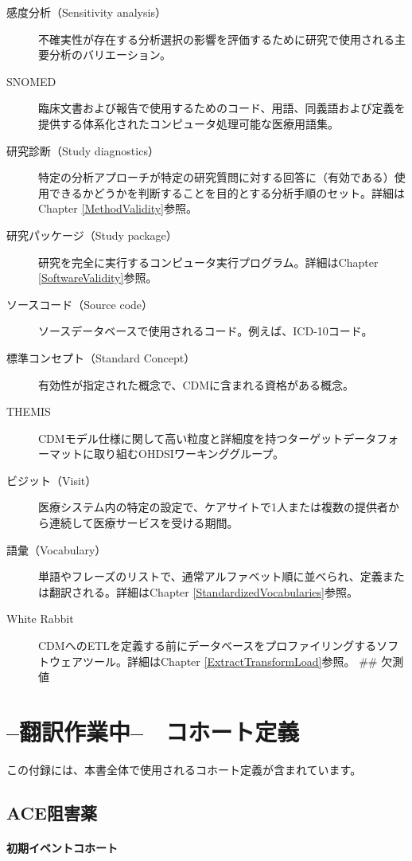 \documentclass[
  11pt]{book}
\theoremstyle{definition}
\theoremstyle{definition}
\theoremstyle{definition}
\theoremstyle{definition}
\theoremstyle{remark}
\begin{document}
\begin{description}
\item[感度分析（Sensitivity analysis）]
不確実性が存在する分析選択の影響を評価するために研究で使用される主要分析のバリエーション。
\item[SNOMED]
臨床文書および報告で使用するためのコード、用語、同義語および定義を提供する体系化されたコンピュータ処理可能な医療用語集。
\item[研究診断（Study diagnostics）]
特定の分析アプローチが特定の研究質問に対する回答に（有効である）使用できるかどうかを判断することを目的とする分析手順のセット。詳細はChapter \ref{MethodValidity}参照。
\item[研究パッケージ（Study package）]
研究を完全に実行するコンピュータ実行プログラム。詳細はChapter \ref{SoftwareValidity}参照。
\item[ソースコード（Source code）]
ソースデータベースで使用されるコード。例えば、ICD-10コード。
\item[標準コンセプト（Standard Concept）]
有効性が指定された概念で、CDMに含まれる資格がある概念。
\item[THEMIS]
CDMモデル仕様に関して高い粒度と詳細度を持つターゲットデータフォーマットに取り組むOHDSIワーキンググループ。
\item[ビジット（Visit）]
医療システム内の特定の設定で、ケアサイトで1人または複数の提供者から連続して医療サービスを受ける期間。
\item[語彙（Vocabulary）]
単語やフレーズのリストで、通常アルファベット順に並べられ、定義または翻訳される。詳細はChapter \ref{StandardizedVocabularies}参照。
\item[White Rabbit]
CDMへのETLを定義する前にデータベースをプロファイリングするソフトウェアツール。詳細はChapter \ref{ExtractTransformLoad}参照。
\#\# 欠測値
\end{description}

\chapter{--翻訳作業中--　コホート定義}\label{CohortDefinitions}

この付録には、本書全体で使用されるコホート定義が含まれています。

\section{ACE阻害薬}\label{AceInhibitors}

\subsubsection*{初期イベントコホート}\label{ux521dux671fux30a4ux30d9ux30f3ux30c8ux30b3ux30dbux30fcux30c8}
\end{document}
